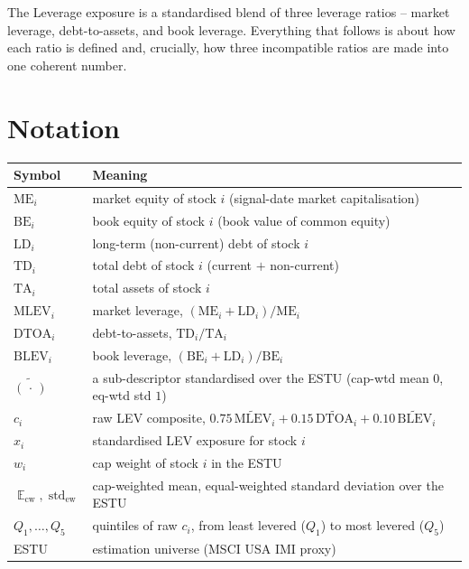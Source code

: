 \documentclass[11pt]{article}
\theoremstyle{definition}
\theoremstyle{plain}
\theoremstyle{remark}
\DeclareMathOperator{\std}{std}
\DeclareMathOperator*{\avg}{\mathbb{E}}
\begin{document}
\begin{keyresult}
The Leverage exposure is a standardised blend of three leverage ratios -- market leverage, debt-to-assets, and book leverage. Everything that follows is about how each ratio is defined and, crucially, how three incompatible ratios are made into one coherent number.
\end{keyresult}

\section*{Notation}

\begin{center}
\begin{tabular}{@{}ll@{}}
\toprule
Symbol & Meaning \\
\midrule
$\text{ME}_i$ & market equity of stock $i$ (signal-date market capitalisation) \\
$\text{BE}_i$ & book equity of stock $i$ (book value of common equity) \\
$\text{LD}_i$ & long-term (non-current) debt of stock $i$ \\
$\text{TD}_i$ & total debt of stock $i$ (current $+$ non-current) \\
$\text{TA}_i$ & total assets of stock $i$ \\
$\text{MLEV}_i$ & market leverage, $(\text{ME}_i+\text{LD}_i)/\text{ME}_i$ \\
$\text{DTOA}_i$ & debt-to-assets, $\text{TD}_i/\text{TA}_i$ \\
$\text{BLEV}_i$ & book leverage, $(\text{BE}_i+\text{LD}_i)/\text{BE}_i$ \\
$\widetilde{(\,\cdot\,)}$ & a sub-descriptor standardised over the ESTU (cap-wtd mean $0$, eq-wtd std $1$) \\
$c_i$ & raw LEV composite, $0.75\,\widetilde{\text{MLEV}}_i+0.15\,\widetilde{\text{DTOA}}_i+0.10\,\widetilde{\text{BLEV}}_i$ \\
$x_i$ & standardised LEV exposure for stock $i$ \\
$w_i$ & cap weight of stock $i$ in the ESTU \\
$\avg_{\text{cw}}, \std_{\text{ew}}$ & cap-weighted mean, equal-weighted standard deviation over the ESTU \\
$Q_1,\dots,Q_5$ & quintiles of raw $c_i$, from least levered ($Q_1$) to most levered ($Q_5$) \\
ESTU & estimation universe (MSCI USA IMI proxy) \\
\bottomrule
\end{tabular}
\end{center}
\end{document}
